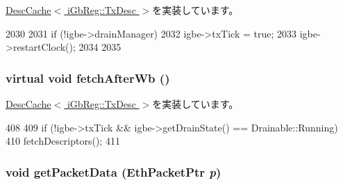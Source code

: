 \hyperlink{classIGbE_1_1DescCache_a9b931707aadb26e13262c50e0dd87006}{DescCache$<$ iGbReg::TxDesc $>$}を実装しています。


\begin{DoxyCode}
2030 {
2031     if (!igbe->drainManager) {
2032         igbe->txTick = true;
2033         igbe->restartClock();
2034     }
2035 }
\end{DoxyCode}
\hypertarget{classIGbE_1_1TxDescCache_abb8070fbcfa38a9697d92bbc4a0b6505}{
\subsubsection[{fetchAfterWb}]{\setlength{\rightskip}{0pt plus 5cm}virtual void fetchAfterWb ()}}
\label{classIGbE_1_1TxDescCache_abb8070fbcfa38a9697d92bbc4a0b6505}


\hyperlink{classIGbE_1_1DescCache_abe568c102619a35d2aa1a37c64dff086}{DescCache$<$ iGbReg::TxDesc $>$}を実装しています。


\begin{DoxyCode}
408                                     {
409             if (!igbe->txTick && igbe->getDrainState() == Drainable::Running)
410                 fetchDescriptors();
411         }
\end{DoxyCode}
\hypertarget{classIGbE_1_1TxDescCache_af58491ad4f774a610584c404231b30ae}{
\subsubsection[{getPacketData}]{\setlength{\rightskip}{0pt plus 5cm}void getPacketData ({\bf EthPacketPtr} {\em p})}}
\label{classIGbE_1_1TxDescCache_af58491ad4f774a610584c404231b30ae}



